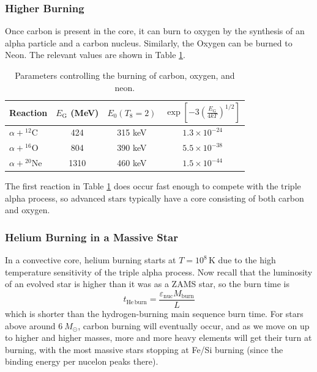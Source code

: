\documentclass[10pt]{article}
\numberwithin{equation}{section}
\newcommand{\n}{\noindent}
\begin{document}
    \subsubsection{Higher Burning}
    \label{sec:higher-burning-1}

    Once carbon is present in the core, it can burn to oxygen by the
    synthesis of an alpha particle and a carbon nucleus. Similarly,
    the Oxygen can be burned to Neon. The relevant values are shown in
    Table \ref{tab:1}.\\

    \begin{table}[h!]
      \centering
      \begin{tabular}{l c c c}
        Reaction & $E_{\mathrm{G}}$ (MeV) & $E_0(T_8=2)$ &
        $\exp\left[-3\left(\frac{E_\mathrm{G}}{4kT}\right)^{1/2}\right]$\\
        \hline\hline
        $\alpha+{}^{12}\mathrm{C}$ & 424 & 315 keV & $1.3\times 10^{-24}$\\
        $\alpha+{}^{16}\mathrm{O}$ & 804 & 390 keV & $5.5\times 10^{-38}$\\
        $\alpha+{}^{20}\mathrm{Ne}$& 1310 & 460 keV & $1.5\times 10^{-44}$
      \end{tabular}
      \caption{Parameters controlling the burning of carbon, oxygen, and neon.}
      \label{tab:1}
    \end{table}
    \n The first reaction in Table \ref{tab:1} does occur fast enough to
    compete with the triple alpha process, so advanced stars typically
    have a core consisting of both carbon and oxygen.

    \subsubsection{Helium Burning in a Massive Star}
    \label{sec:heli-burn-mass}
    In a convective core, helium burning starts at
    $T=10^8\,\mathrm{K}$ due to the high temperature sensitivity of
    the triple alpha process. Now recall that the luminosity of an
    evolved star is higher than it was as a ZAMS star, so the burn
    time is
    \begin{equation}
      \label{eq:276}
      t_{\mathrm{He\,burn}} =
      \frac{\varepsilon_{\mathrm{nuc}}M_{\mathrm{burn}}}{L}
    \end{equation}
    which is shorter than the hydrogen-burning main sequence burn
    time. For stars above around $6\ M_\odot$, carbon burning will
    eventually occur, and as we move on up to higher and higher
    masses, more and more heavy elements will get their turn at
    burning, with the most massive stars stopping at Fe/Si burning
    (since the binding energy per nucelon peaks there).\\
\end{document}
